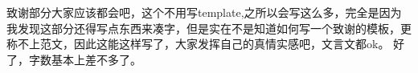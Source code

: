 
\begin{acknowledgements}

致谢部分大家应该都会吧，这个不用写template,之所以会写这么多，完全是因为我发现这部分还得写点东西来凑字，但是实在不是知道如何写一个致谢的模板，更称不上范文，因此这能这样写了，大家发挥自己的真情实感吧，文言文都ok。
好了，字数基本上差不多了。

\end{acknowledgements}
